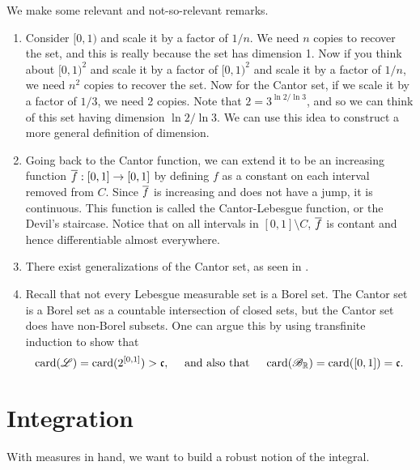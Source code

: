 \documentclass[12pt]{article} %
\begin{document}
\begin{remark}
    We make some relevant and not-so-relevant remarks.\begin{enumerate}
        \item Consider $[0,1)$ and scale it by a factor of $1/n$. We need $n$ copies to recover the set, and this is really because the set has dimension 1. Now if you think about $[0,1)^2$ and scale it by a factor of $[0,1)^2$ and scale it by a factor of $1/n$, we need $n^2$ copies to recover the set. Now for the Cantor set, if we scale it by a factor of $1/3$, we need 2 copies. Note that $2 = 3^{\ln 2 / \ln 3}$, and so we can think of this set having dimension $\ln 2 / \ln 3$. We can use this idea to construct a more general definition of dimension.
        \item Going back to the Cantor function, we can extend it to be an increasing function $\overline{f} : [0,1] \to [0,1]$ by defining $f$ as a constant on each interval removed from $C$. Since $\overline{f}$ is increasing and does not have a jump, it is continuous. This function is called the Cantor-Lebesgue function, or the Devil's staircase. Notice that on all intervals in $[0,1] \setminus C$, $\overline{f}$ is contant and hence differentiable almost everywhere. 
        \item There exist generalizations of the Cantor set, as seen in \citet[Exercise~32]{folland1999real}.
        \item Recall that not every Lebesgue measurable set is a Borel set. The Cantor set is a Borel set as a countable intersection of closed sets, but the Cantor set does have non-Borel subsets. One can argue this by using transfinite induction to show that \[\operatorname{card}(\mathscr{L}) = \operatorname{card}(2^{[0,1]}) > \mathfrak{c}, \ \ \ \ \text{and also that} \ \ \ \ \operatorname{card}(\mathscr{B}_{\mathbb{R}}) = \operatorname{card}([0,1]) = \mathfrak{c}.\]
    \end{enumerate}
\end{remark}

\section{Integration}

With measures in hand, we want to build a robust notion of the integral. 
\end{document}

